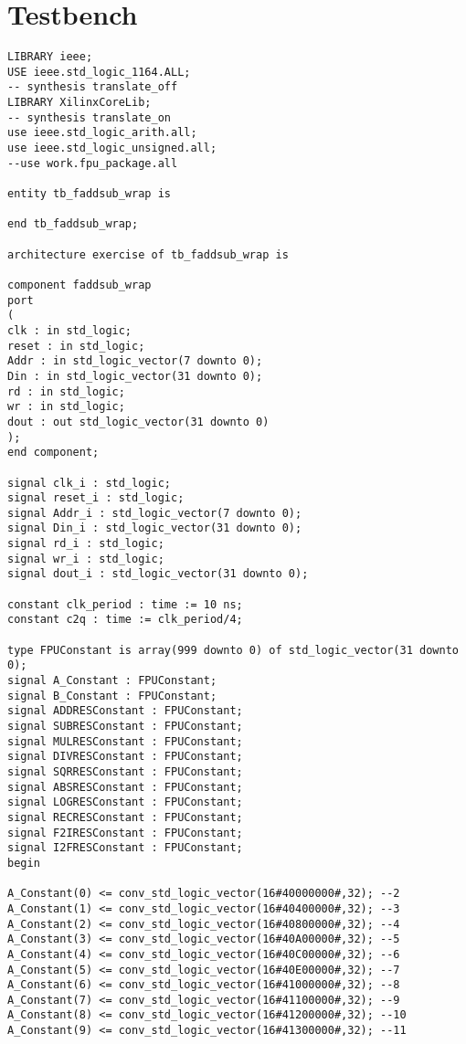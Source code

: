 \documentclass[conference]{IEEEtran}
\begin{document}
\section{Testbench}
	\begin{lstlisting}	
LIBRARY ieee;
USE ieee.std_logic_1164.ALL;
-- synthesis translate_off
LIBRARY XilinxCoreLib;
-- synthesis translate_on
use ieee.std_logic_arith.all;
use ieee.std_logic_unsigned.all;
--use work.fpu_package.all

entity tb_faddsub_wrap is

end tb_faddsub_wrap;

architecture exercise of tb_faddsub_wrap is

component faddsub_wrap
port
(
clk : in std_logic;
reset : in std_logic;
Addr : in std_logic_vector(7 downto 0);
Din : in std_logic_vector(31 downto 0);
rd : in std_logic;
wr : in std_logic;
dout : out std_logic_vector(31 downto 0)
);
end component;

signal clk_i : std_logic;
signal reset_i : std_logic;
signal Addr_i : std_logic_vector(7 downto 0);
signal Din_i : std_logic_vector(31 downto 0);
signal rd_i : std_logic;
signal wr_i : std_logic;
signal dout_i : std_logic_vector(31 downto 0);

constant clk_period : time := 10 ns;
constant c2q : time := clk_period/4;

type FPUConstant is array(999 downto 0) of std_logic_vector(31 downto 0);
signal A_Constant : FPUConstant;
signal B_Constant : FPUConstant;
signal ADDRESConstant : FPUConstant;
signal SUBRESConstant : FPUConstant;
signal MULRESConstant : FPUConstant;
signal DIVRESConstant : FPUConstant;
signal SQRRESConstant : FPUConstant;
signal ABSRESConstant : FPUConstant;
signal LOGRESConstant : FPUConstant;
signal RECRESConstant : FPUConstant;
signal F2IRESConstant : FPUConstant;
signal I2FRESConstant : FPUConstant;
begin

A_Constant(0) <= conv_std_logic_vector(16#40000000#,32); --2
A_Constant(1) <= conv_std_logic_vector(16#40400000#,32); --3
A_Constant(2) <= conv_std_logic_vector(16#40800000#,32); --4
A_Constant(3) <= conv_std_logic_vector(16#40A00000#,32); --5
A_Constant(4) <= conv_std_logic_vector(16#40C00000#,32); --6
A_Constant(5) <= conv_std_logic_vector(16#40E00000#,32); --7
A_Constant(6) <= conv_std_logic_vector(16#41000000#,32); --8
A_Constant(7) <= conv_std_logic_vector(16#41100000#,32); --9
A_Constant(8) <= conv_std_logic_vector(16#41200000#,32); --10
A_Constant(9) <= conv_std_logic_vector(16#41300000#,32); --11



\end{lstlisting}
\end{document}
